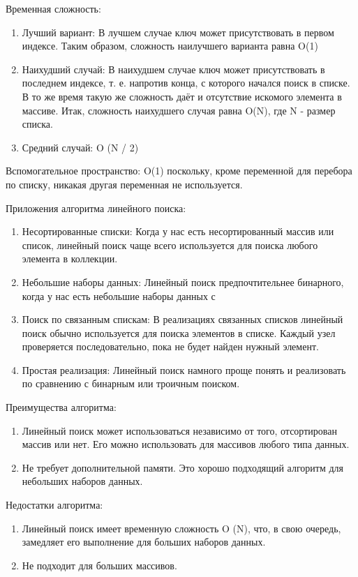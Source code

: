 Временная сложность:
\begin{enumerate}
\item Лучший вариант: В лучшем случае ключ может присутствовать в первом индексе. Таким образом, сложность наилучшего варианта равна O(1)
\item Наихудший случай: В наихудшем случае ключ может присутствовать в последнем индексе, т. е. напротив конца, с которого начался поиск в списке. В то же время такую же сложность даёт и отсутствие искомого элемента в массиве. Итак, сложность наихудшего случая равна O(N), где N - размер списка.
\item Средний случай: O (N / 2)
\end{enumerate}

Вспомогательное пространство: O(1) поскольку, кроме переменной для перебора по списку, никакая другая переменная не используется.

Приложения алгоритма линейного поиска:
\begin{enumerate}
\item Несортированные списки: Когда у нас есть несортированный массив или список, линейный поиск чаще всего используется для поиска любого элемента в коллекции.
\item Небольшие наборы данных: Линейный поиск предпочтительнее бинарного, когда у нас есть небольшие наборы данных с
\item Поиск по связанным спискам: В реализациях связанных списков линейный поиск обычно используется для поиска элементов в списке. Каждый узел проверяется последовательно, пока не будет найден нужный элемент.
\item Простая реализация: Линейный поиск намного проще понять и реализовать по сравнению с бинарным или троичным поиском.
\end{enumerate}

Преимущества алгоритма:
\begin{enumerate}
\item Линейный поиск может использоваться независимо от того, отсортирован массив или нет. Его можно использовать для массивов любого типа данных.
\item Не требует дополнительной памяти.
Это хорошо подходящий алгоритм для небольших наборов данных.
\end{enumerate}

Недостатки алгоритма:
\begin{enumerate}
\item Линейный поиск имеет временную сложность O (N), что, в свою очередь, замедляет его выполнение для больших наборов данных.
\item Не подходит для больших массивов.
\end{enumerate}

